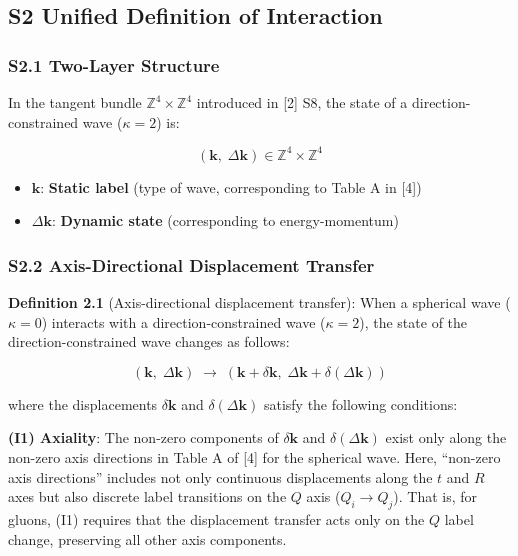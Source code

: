 \documentclass[
  a4paper,11pt]{article}
\providecommand{\tightlist}{%
  \setlength{\itemsep}{0pt}\setlength{\parskip}{0pt}}
\theoremstyle{definition}
\theoremstyle{remark}
\begin{document}
\subsection{S2 Unified Definition of
Interaction}\label{s2-unified-definition-of-interaction}

\subsubsection{S2.1 Two-Layer Structure}\label{s2.1-two-layer-structure}

In the tangent bundle \(\mathbb{Z}^4 \times \mathbb{Z}^4\) introduced in
{[}2{]} S8, the state of a direction-constrained wave (\(\kappa = 2\))
is:

\[(\mathbf{k},\; \Delta\mathbf{k}) \in \mathbb{Z}^4 \times \mathbb{Z}^4\]

\begin{itemize}
\tightlist
\item
  \(\mathbf{k}\): \textbf{Static label} (type of wave, corresponding to
  Table A in {[}4{]})
\item
  \(\Delta\mathbf{k}\): \textbf{Dynamic state} (corresponding to
  energy-momentum)
\end{itemize}

\subsubsection{S2.2 Axis-Directional Displacement
Transfer}\label{s2.2-axis-directional-displacement-transfer}

\textbf{Definition 2.1} (Axis-directional displacement transfer): When a
spherical wave (\(\kappa = 0\)) interacts with a direction-constrained
wave (\(\kappa = 2\)), the state of the direction-constrained wave
changes as follows:

\[(\mathbf{k},\; \Delta\mathbf{k}) \;\longrightarrow\; (\mathbf{k} + \delta\mathbf{k},\; \Delta\mathbf{k} + \delta(\Delta\mathbf{k}))\]

where the displacements \(\delta\mathbf{k}\) and
\(\delta(\Delta\mathbf{k})\) satisfy the following conditions:

\textbf{(I1) Axiality}: The non-zero components of \(\delta\mathbf{k}\)
and \(\delta(\Delta\mathbf{k})\) exist only along the non-zero axis
directions in Table A of {[}4{]} for the spherical wave. Here,
``non-zero axis directions'' includes not only continuous displacements
along the \(t\) and \(R\) axes but also discrete label transitions on
the \(Q\) axis (\(Q_i \to Q_j\)). That is, for gluons, (I1) requires
that the displacement transfer acts only on the \(Q\) label change,
preserving all other axis components.
\end{document}
